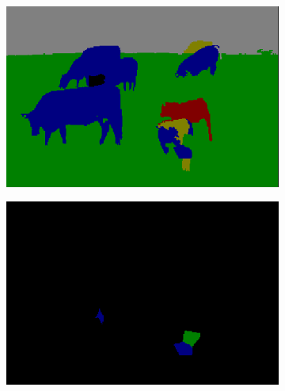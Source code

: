 \documentclass{article} %
\begin{document}
\begin{figure}[htb]
\begin{subfigure}[t]{0.19\textwidth}
		\caption{}
		\label{fig:prior_good}
	\end{subfigure}
	\begin{subfigure}[t]{0.19\textwidth}
		\centering
		\includegraphics[width = \textwidth]{./img/1_11_s_final.png}
		\caption{}
		\label{fig:final_good}
	\end{subfigure}
	\begin{subfigure}[t]{0.19\textwidth}
		\centering
		\includegraphics[width = \textwidth]{./img/1_11_s_changed.png}
		\caption{}
		\label{fig:changed_good}
	\end{subfigure}
	

\end{figure}
\end{document}
